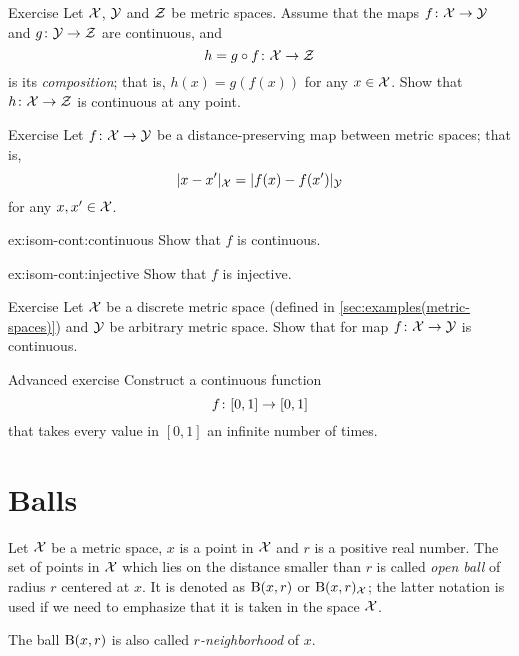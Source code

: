 \begin{thm}{Exercise}\label{ex:comp+cont}
Let $\mathcal{X}$, $\mathcal{Y}$ and $\mathcal{Z}$ be metric spaces.
Assume that the maps $f\colon\mathcal{X}\to\mathcal{Y}$
and $g\colon\mathcal{Y}\to\mathcal{Z}$ are continuous,
and 
\[h=g\circ f\colon\mathcal{X}\to \mathcal{Z}\] is its \emph{composition};
that is, $h(x)=g(f(x))$ for any $x\in \mathcal{X}$.
Show that $h\colon\mathcal{X}\to\mathcal{Z}$ is continuous at any point.
\end{thm}

\begin{thm}{Exercise}\label{ex:isom-cont}
Let $f\colon\mathcal{X}\to\mathcal{Y}$ be a distance-preserving map between metric spaces;
that is,
\[|x-x'|_{\mathcal X}=
|f(x)-f(x')|_{\mathcal Y}\]
for any $x,x'\in \mathcal{X}$.

\begin{subthm}{ex:isom-cont:continuous}
Show that $f$ is continuous.
\end{subthm}

\begin{subthm}{ex:isom-cont:injective}
Show that $f$ is injective.
\end{subthm}

\end{thm}

\begin{thm}{Exercise}\label{ex:to-descrete}
Let $\mathcal{X}$ be a discrete metric space (defined in \ref{sec:examples(metric-spaces)})
and $\mathcal{Y}$ be arbitrary metric space.
Show that for map $f\colon\mathcal{X}\to\mathcal{Y}$ is continuous.
\end{thm}



\begin{thm}{Advanced exercise}\label{ex:infinite-inverse-image}
Construct a continuous function 
\[f\:[0,1]\z\to [0,1]\] that takes every value in $[0,1]$ 
an infinite number of times.
\end{thm}


\section{Balls}

Let $\mathcal{X}$ be a metric space, 
$x$ is a point in $\mathcal{X}$ 
and $r$ is a positive real number.
The set of points in $\mathcal{X}$ which lies on the distance smaller than $r$ is called \emph{open ball} of radius $r$ centered at $x$.
It is denoted as $\mathrm{B}(x,r)$ 
or $\mathrm{B}(x,r)_{\mathcal{X}}$;
the latter notation is used if we need to emphasize that it is taken in the space $\mathcal{X}$.

The ball $\mathrm{B}(x,r)$ is also called \emph{$r$-neighborhood} of $x$.

